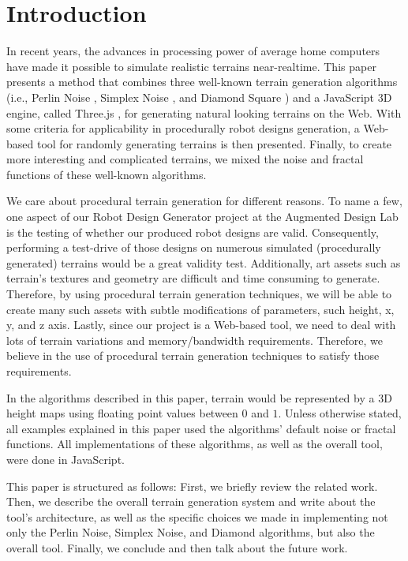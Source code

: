 \section{Introduction} %
\label{sec:introduction}

In recent years, the advances in processing power of average home computers have made it possible to simulate realistic terrains near-realtime. This paper presents a method that combines three well-known terrain generation algorithms (i.e., Perlin Noise  \cite{perlin:2002}, Simplex Noise \cite{perlin:2001}, and Diamond Square \cite{fournier:1982}) and a JavaScript 3D engine, called Three.js \cite{threeJS}, for generating natural looking terrains on the Web. With some criteria for applicability in procedurally robot designs generation, a Web-based tool for randomly generating terrains is then presented. Finally, to create more interesting and complicated terrains, we mixed the noise and fractal functions of these well-known algorithms.     

We care about procedural terrain generation for different reasons. To name a few, one aspect of our Robot Design Generator project at the Augmented Design Lab is the testing of whether our produced robot designs are valid. Consequently, performing a test-drive of those designs on numerous simulated (procedurally generated) terrains would be a great validity test. Additionally, art assets such as terrain's textures and geometry are difficult and time consuming to generate. Therefore, by using procedural terrain generation techniques, we will be able to create many such assets with subtle modifications of parameters, such height, x, y, and z axis. Lastly, since our project is a Web-based tool, we need to deal with lots of terrain variations and memory/bandwidth requirements. Therefore, we believe in the use of procedural terrain generation techniques to satisfy those requirements.    

In the algorithms described in this paper, terrain would be represented by a 3D height maps using floating point values between $0$ and $1$. Unless otherwise stated, all examples explained in this paper used the algorithms' default noise or fractal functions. All implementations of these algorithms, as well as the overall tool, were done in JavaScript.  

This paper is structured as follows: First, we briefly review the related work. Then, we describe the overall terrain generation system and write about the tool's architecture, as well as the specific choices we made in implementing not only the Perlin Noise, Simplex Noise, and Diamond algorithms, but also the overall tool. Finally, we conclude and then talk about the future work.  

